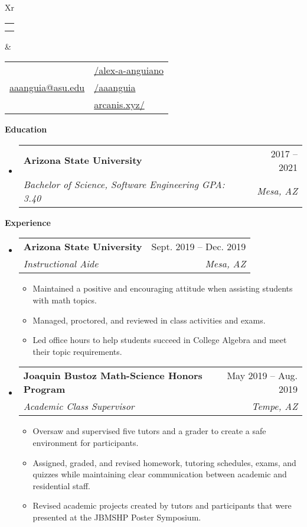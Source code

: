 \documentclass[letterpaper,12pt]{article}[leftmargin=*]
\makeatletter
\def \fullname {Alex Anguiano}
\def \subtitle {}
\def \linkedinicon {\faLinkedin}
\def \linkedinlink {https://www.linkedin.com/in/alex-a-anguiano/}
\def \linkedintext {/alex-a-anguiano}
\def \phoneicon {\faPhone}
\def \phonetext {+1-480-335-2816}
\def \emailicon {\faEnvelope}
\def \emaillink {mailto:aaanguia@asu.edu}
\def \emailtext {aaanguia@asu.edu}
\def \githubicon {\faGithub}
\def \githublink {https://github.com/aaanguia}
\def \githubtext {/aaanguia}
\def \websiteicon {\faGlobe}
\def \websitelink {http://arcanis.xyz/}
\def \websitetext {arcanis.xyz/}
\def \headertype {\doublecol} %
\def \entryspacing {-0pt}
\def \linkedin {\linkedinicon \hspace{3pt}\href{\linkedinlink}{\linkedintext}}
\def \phone {\phoneicon \hspace{3pt}{ \phonetext}}
\def \email {\emailicon \hspace{3pt}\href{\emaillink}{\emailtext}}
\def \github {\githubicon \hspace{3pt}\href{\githublink}{\githubtext}}
\def \website {\websiteicon \hspace{3pt}\href{\websitelink}{\websitetext}}
\renewcommand{\section}[2]{\vspace{5pt}
  \colorbox{secondary}{\color{white}\raggedbottom\normalsize\textbf{{#1}{\hspace{7pt}#2}}}
}
\newcommand{\resumeEntryStart}{\begin{itemize}[leftmargin=2.5mm]}
\newcommand{\resumeEntryEnd}{\end{itemize}\vspace{\entryspacing}}
\newcommand{\resumeItemListStart}{\begin{itemize}[leftmargin=4.5mm]}
\newcommand{\resumeItemListEnd}{\end{itemize}}
\newcommand{\resumeItem}[1]{
  \item\small{
    {#1 \vspace{-2pt}}
  }
}
\newcommand{\resumeEntryTSDL}[4]{
  \vspace{-1pt}\item[]
    \begin{tabularx}{0.97\textwidth}{X@{\hspace{60pt}}r}
      \textbf{\color{primary}#1} & {\firabook\color{accent}\small#2} \\
      \textit{\color{accent}\small#3} & \textit{\color{accent}\small#4} \\
    \end{tabularx}\vspace{-6pt}
}
\newcommand{\doublecol}[6]{
  \begin{tabularx}{\textwidth}{Xr}
    {
      \begin{tabular}[c]{l}
        \fontsize{35}{45}\selectfont{\color{primary}{{\textbf{\fullname}}}} \\
        {\textit{\subtitle}} %
      \end{tabular}
    } & {
      \begin{tabular}[c]{l@{\hspace{1.5em}}l}
        {\small#4} & {\small#1} \\
        {\small#5} & {\small#2} \\
        {\small#6} & {\small#3}
      \end{tabular}
    }
  \end{tabularx}
}
\newcommand{\singlecol}[6]{
  \begin{tabularx}{\textwidth}{Xr}
    {
      \begin{tabular}[b]{l}
        \fontsize{35}{45}\selectfont{\color{primary}{{\textbf{\fullname}}}} \\
        {\textit{\subtitle}} %
      \end{tabular}
    } & {
      \begin{tabular}[c]{l}
        {\small#1} \\
        {\small#2} \\
        {\small#3} \\
        {\small#4} \\
        {\small#5} \\
        {\small#6}
      \end{tabular}
    }
  \end{tabularx}
}
\makeatother
\begin{document}


\headertype{\linkedin}{\github}{\website}{\phone}{\email}{} %
\vspace{-10pt} %

\section{\faGraduationCap}{Education}

  \resumeEntryStart
    \resumeEntryTSDL
      {Arizona State University}{2017 -- 2021}
      {Bachelor of Science, Software Engineering \quad GPA: 3.40}{Mesa, AZ}
  \resumeEntryEnd

\section{\faPieChart}{Experience}

  \resumeEntryStart
    \resumeEntryTSDL
      {Arizona State University}{Sept. 2019 -- Dec. 2019}
      {Instructional Aide}{Mesa, AZ}
    \resumeItemListStart
      \resumeItem {Maintained a positive and encouraging attitude when assisting students with math topics.}
      \resumeItem {Managed, proctored, and reviewed in class activities and exams.}
      \resumeItem {Led office hours to help students succeed in College Algebra and meet their topic requirements. }
    \resumeItemListEnd
  \resumeEntryEnd

  \resumeEntryStart
    \resumeEntryTSDL
      {Joaquin Bustoz Math-Science Honors Program}{May 2019 -- Aug. 2019}
      {Academic Class Supervisor}{Tempe, AZ}
    \resumeItemListStart
      \resumeItem {Oversaw and supervised five tutors and a grader to create a safe environment for participants.}
      \resumeItem {Assigned, graded, and revised homework, tutoring schedules, exams, and quizzes while maintaining clear communication between academic and residential staff.}
      \resumeItem {Revised academic projects created by tutors and participants that were presented at the JBMSHP Poster Symposium.}
    \resumeItemListEnd
  \resumeEntryEnd
\end{document}
